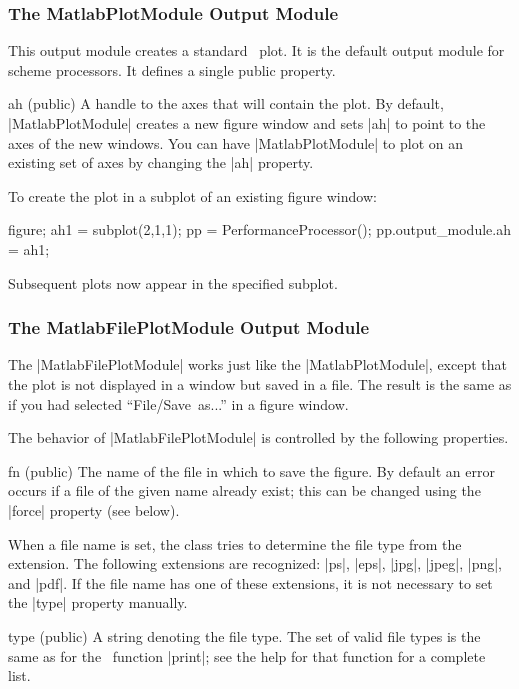 \subsubsection{The MatlabPlotModule Output Module}

This output module creates a standard \matlab\ plot. It is the default output
module for scheme processors. It defines a single public property.
\begin{property}{ah (public)}
  A handle to the axes that will contain the plot. By default,
  |MatlabPlotModule| creates a new figure window and sets |ah| to point to the
  axes of the new windows. You can have |MatlabPlotModule| to plot on an
  existing set of axes by changing the |ah| property. 
    
  \codeexample To create the plot in a subplot of an existing figure window:
\begin{Code}
  figure;
  ah1 = subplot(2,1,1);
  pp = PerformanceProcessor();
  pp.output_module.ah = ah1;
\end{Code}
  Subsequent plots now appear in the specified subplot.
\end{property}


\subsubsection{The MatlabFilePlotModule Output Module}

The |MatlabFilePlotModule| works just like the |MatlabPlotModule|, except that
the plot is not displayed in a window but saved in a file. The result is the
same as if you had selected ``File\slash Save~as...'' in a figure window. 

The behavior of |MatlabFilePlotModule| is controlled by the following
properties.
\begin{property}{fn (public)}
  The name of the file in which to save the figure. By
  default an error occurs if a file of the given name already exist; this can
  be changed using the |force| property (see below).

  When a file name is set, the class tries to determine the file type from the
  extension. The following extensions are recognized: |ps|, |eps|, |jpg|,
  |jpeg|, |png|, and |pdf|. If the file name has one of these extensions, it
  is not necessary to set the |type| property manually.
\end{property}

\begin{property}{type (public)}
  A string denoting the file type. The set of valid file
  types is the same as for the \matlab\ function |print|; see the help for
  that function for a complete list. 
\end{property}

